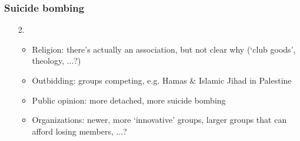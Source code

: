 \documentclass[aspectratio=43]{beamer}
\begin{document}
\begin{frame}
\frametitle{Suicide bombing}
\centering

\begin{itemize}[<+->]
  \item[2.] {\color{red}{Group tactical choice}}
  \begin{itemize}
    \item Religion: there's actually an association, but not clear why (`club goods', theology, ...?)
    \item Outbidding: groups competing, e.g. Hamas \& Islamic Jihad in Palestine
    \item Public opinion: more detached, more suicide bombing
    \item Organizations: newer, more `innovative' groups, larger groups that can afford losing members, ...?
  \end{itemize}
\end{itemize}

\end{frame}
\end{document}
